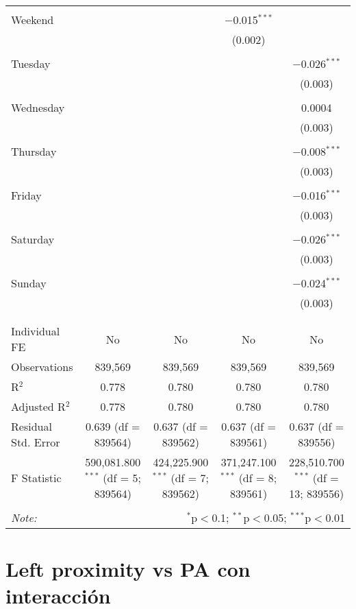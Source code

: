 \documentclass[
]{article}
\begin{document}
\begin{table}[!htbp]
{\begin{tabular}{@{\extracolsep{5pt}}lcccc}
  & & & & \\ 
 Weekend &  &  & $-$0.015$^{***}$ &  \\ 
  &  &  & (0.002) &  \\ 
  & & & & \\ 
 Tuesday &  &  &  & $-$0.026$^{***}$ \\ 
  &  &  &  & (0.003) \\ 
  & & & & \\ 
 Wednesday &  &  &  & 0.0004 \\ 
  &  &  &  & (0.003) \\ 
  & & & & \\ 
 Thursday &  &  &  & $-$0.008$^{***}$ \\ 
  &  &  &  & (0.003) \\ 
  & & & & \\ 
 Friday &  &  &  & $-$0.016$^{***}$ \\ 
  &  &  &  & (0.003) \\ 
  & & & & \\ 
 Saturday &  &  &  & $-$0.026$^{***}$ \\ 
  &  &  &  & (0.003) \\ 
  & & & & \\ 
 Sunday &  &  &  & $-$0.024$^{***}$ \\ 
  &  &  &  & (0.003) \\ 
  & & & & \\ 
\hline \\[-1.8ex] 
Individual FE & No & No & No & No \\ 
Observations & 839,569 & 839,569 & 839,569 & 839,569 \\ 
R$^{2}$ & 0.778 & 0.780 & 0.780 & 0.780 \\ 
Adjusted R$^{2}$ & 0.778 & 0.780 & 0.780 & 0.780 \\ 
Residual Std. Error & 0.639 (df = 839564) & 0.637 (df = 839562) & 0.637 (df = 839561) & 0.637 (df = 839556) \\ 
F Statistic & 590,081.800$^{***}$ (df = 5; 839564) & 424,225.900$^{***}$ (df = 7; 839562) & 371,247.100$^{***}$ (df = 8; 839561) & 228,510.700$^{***}$ (df = 13; 839556) \\ 
\hline 
\hline \\[-1.8ex] 
\textit{Note:}  & \multicolumn{4}{r}{$^{*}$p$<$0.1; $^{**}$p$<$0.05; $^{***}$p$<$0.01} \\ 
\end{tabular}
} 
\end{table} 
\newpage
\section{Left proximity vs PA con interacción}
\end{document}
